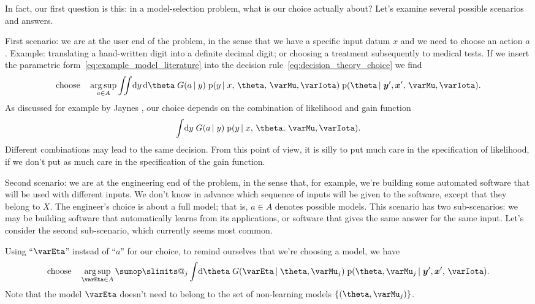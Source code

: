 \documentclass[\ifafour a4paper,12pt,\else a5paper,10pt,\fi%
onecolumn,oneside,article,%
british%
]{memoir}
\makeatletter
\theoremstyle{remark}
\theoremstyle{innote}
\def\sum{\DOTSI\sumop\slimits@}
\newcommand*{\citey}{\parencites*}
\newcommand*{\di}{\mathrm{d}}%
\DeclarePairedDelimiter\set{\{}{\}}
\newcommand*{\pf}{\mathrm{p}}%
\renewcommand*{\|}{\nonscript\,\vert\nonscript\;\mathopen{}}
\newcommand*{\sect}{\S}%
\DeclareMathOperator*{\argsup}{arg\,sup}
\newcommand*{\yM}{\varMu}
\newcommand*{\yA}{A}
\newcommand*{\yX}{X}
\newcommand*{\yx}{\bm{x}}
\newcommand*{\yy}{\bm{y}}
\newcommand*{\yI}{\varIota}
\newcommand*{\yg}{G}
\newcommand*{\yHm}{\yM}
\newcommand*{\ym}{\varEta}
\makeatother
\begin{document}
In fact, our first question is this: in a model-selection problem, what is
our choice actually about? Let's examine several possible scenarios and answers.


\bigskip

First scenario: we are at the user end of the problem, in the sense that we
have a specific input datum $x$ and we need to choose an action $a$. Example:
translating a hand-written digit into a definite decimal digit; or choosing
a treatment subsequently to medical tests. If we insert the parametric
form~\eqref{eq:example_model_literature} into the decision
rule~\eqref{eq:decision_theory_choice} we find
\begin{equation}
  \label{eq:param_decision_theory_choice}
  \text{choose} \quad
  \argsup_{a \in \yA}
  \iint\!\di y\,\di\theta\; \yg(a \| y)\; \pf(y \| x,\, \theta,\, \yM, \yI)\;
  \pf(\theta \| \yy',\yx',\, \yM, \yI).
\end{equation}
As discussed for example by Jaynes \citey[\sect~13.12.1]{jaynes1994_r2003},
our choice depends on the combination of likelihood and gain function
\begin{equation}
  \label{eq:combined_likelihood_gain}
  \int\!\di y\; \yg(a \| y)\; \pf(y \| x,\, \theta,\, \yM, \yI).
\end{equation}
Different combinations may lead to the same decision. From this point of
view, it is silly to put much care in the specification of likelihood, if
we don't put as much care in the specification of the gain function.

\bigskip

Second scenario: we are at the engineering end of the problem, in the sense
that, for example, we're building some automated software that will be used
with different inputs. We don't know in advance which sequence of inputs
will be given to the software, except that they belong to $\yX$. The
engineer's choice is about a full model; that is, $a \in \yA$ denotes
possible models. This scenario has two sub-scenarios: we may be building
software that automatically learns from its applications, or software that
gives the same answer for the same input. Let's consider the second
sub-scenario, which currently seems most common.

Using \enquote{$\ym$} instead of \enquote{$a$} for our choice, to
remind ourselves that we're choosing a model, we have
\begin{equation}
  \label{eq:engineer_decision_theory_choice}
  \text{choose} \quad
  \argsup_{\ym \in \yA}
  \sum_j\int\!\di\theta\; \yg(\ym \| \theta,\yHm_j)\; \pf(\theta, \yHm_j \| \yy',\yx',\, \yI).
\end{equation}
Note that the model $\ym$ doesn't need to belong to the set of non-learning
models $\set{(\theta,\yHm_j)}$.
\end{document}
